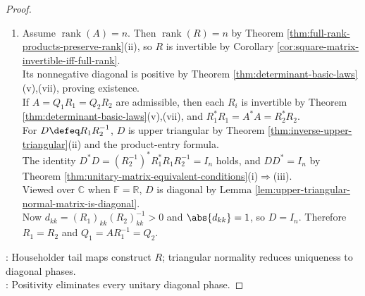 \begin{theorem}
\begin{proof}
\begin{enumerate}[label=(\roman*)]
For $V\defeq W^*=[Q\ Q']$, $A=V\left[\begin{smallmatrix}R\\0\end{smallmatrix}\right]=QR$ and $Q^*Q=I_n$ by unitarity and block multiplication.
\item Assume $\operatorname{rank}(A)=n$. Then $\operatorname{rank}(R)=n$ by Theorem \ref{thm:full-rank-products-preserve-rank}(ii), so $R$ is invertible by Corollary \ref{cor:square-matrix-invertible-iff-full-rank}.\\
Its nonnegative diagonal is positive by Theorem \ref{thm:determinant-basic-laws}(v),(vii), proving existence.\\
If $A=Q_1R_1=Q_2R_2$ are admissible, then each $R_i$ is invertible by Theorem \ref{thm:determinant-basic-laws}(v),(vii), and $R_1^*R_1=A^*A=R_2^*R_2$.\\
For $D\defeq R_1R_2^{-1}$, $D$ is upper triangular by Theorem \ref{thm:inverse-upper-triangular}(ii) and the product-entry formula.\\
The identity $D^*D=(R_2^{-1})^*R_1^*R_1R_2^{-1}=I_n$ holds, and $DD^*=I_n$ by Theorem \ref{thm:unitary-matrix-equivalent-conditions}(i)$\Rightarrow$(iii).\\
Viewed over $\mathbb{C}$ when $\mathbb{F}=\mathbb{R}$, $D$ is diagonal by Lemma \ref{lem:upper-triangular-normal-matrix-is-diagonal}.\\
Now $d_{kk}=(R_1)_{kk}(R_2)_{kk}^{-1}>0$ and $\abs{d_{kk}}=1$, so $D=I_n$. Therefore $R_1=R_2$ and $Q_1=AR_1^{-1}=Q_2$.
\end{enumerate}
: Householder tail maps construct $R$; triangular normality reduces uniqueness to diagonal phases.\\
: Positivity eliminates every unitary diagonal phase.
\end{proof}
\end{theorem}

